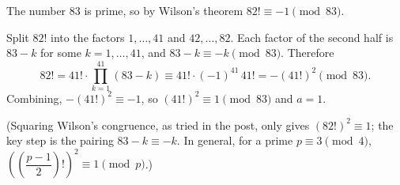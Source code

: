 The number $83$ is prime, so by Wilson's theorem $82!\equiv-1\pmod{83}$.

Split $82!$ into the factors $1,\dots,41$ and $42,\dots,82$. Each factor of the second half is $83-k$ for some $k=1,\dots,41$, and $83-k\equiv-k\pmod{83}$. Therefore
\[
82!=41!\cdot\prod_{k=1}^{41}(83-k)\equiv41!\cdot(-1)^{41}\,41!=-(41!)^2\pmod{83}.
\]
Combining, $-(41!)^2\equiv-1$, so $(41!)^2\equiv1\pmod{83}$ and $a=\boxed{1}$.

(Squaring Wilson's congruence, as tried in the post, only gives $(82!)^2\equiv1$; the key step is the pairing $83-k\equiv-k$. In general, for a prime $p\equiv3\pmod4$, $\left(\left(\dfrac{p-1}{2}\right)!\right)^2\equiv1\pmod p$.)
